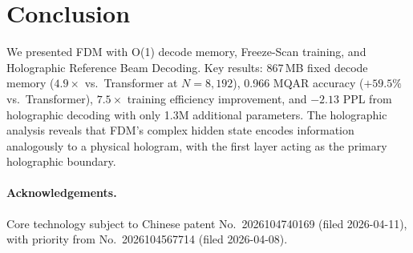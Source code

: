 \documentclass{article}
\begin{document}
\section{Conclusion}

We presented FDM with O(1) decode memory, Freeze-Scan training,
and Holographic Reference Beam Decoding.
Key results: 867\,MB fixed decode memory ($4.9\times$ vs.\ Transformer at
$N{=}8{,}192$), 0.966 MQAR accuracy ($+59.5\%$ vs.\ Transformer),
$7.5\times$ training efficiency improvement, and $-2.13$ PPL
from holographic decoding with only 1.3M additional parameters.
The holographic analysis reveals that FDM's complex hidden state
encodes information analogously to a physical hologram,
with the first layer acting as the primary holographic boundary.

\paragraph{Acknowledgements.}
Core technology subject to Chinese patent No.\ 2026104740169 (filed 2026-04-11),
with priority from No.\ 2026104567714 (filed 2026-04-08).



\end{document}
